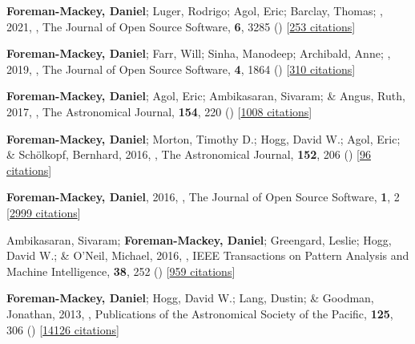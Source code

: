 \item[{\color{numcolor}\scriptsize7}] \textbf{Foreman-Mackey, Daniel}; Luger, Rodrigo; Agol, Eric; Barclay, Thomas; \etal, 2021, , The Journal of Open Source Software, \textbf{6}, 3285 () [\href{https://ui.adsabs.harvard.edu/abs/2021JOSS....6.3285F}{253 citations}]

\item[{\color{numcolor}\scriptsize6}] \textbf{Foreman-Mackey, Daniel}; Farr, Will; Sinha, Manodeep; Archibald, Anne; \etal, 2019, , The Journal of Open Source Software, \textbf{4}, 1864 () [\href{https://ui.adsabs.harvard.edu/abs/2019JOSS....4.1864F}{310 citations}]

\item[{\color{numcolor}\scriptsize5}] \textbf{Foreman-Mackey, Daniel}; Agol, Eric; Ambikasaran, Sivaram; \& Angus, Ruth, 2017, , The Astronomical Journal, \textbf{154}, 220 () [\href{https://ui.adsabs.harvard.edu/abs/2017AJ....154..220F}{1008 citations}]

\item[{\color{numcolor}\scriptsize4}] \textbf{Foreman-Mackey, Daniel}; Morton, Timothy D.; Hogg, David W.; Agol, Eric; \& Sch{\"o}lkopf, Bernhard, 2016, , The Astronomical Journal, \textbf{152}, 206 () [\href{https://ui.adsabs.harvard.edu/abs/2016AJ....152..206F}{96 citations}]

\item[{\color{numcolor}\scriptsize3}] \textbf{Foreman-Mackey, Daniel}, 2016, , The Journal of Open Source Software, \textbf{1}, 2 [\href{https://scholar.google.com/scholar?cites=1835087844145558435,17325274697099535179,14220488595059618709,12820425635803494730,7284810048757141243,17415935839493019063}{2999 citations}]

\item[{\color{numcolor}\scriptsize2}] Ambikasaran, Sivaram; \textbf{Foreman-Mackey, Daniel}; Greengard, Leslie; Hogg, David W.; \& O'Neil, Michael, 2016, , IEEE Transactions on Pattern Analysis and Machine Intelligence, \textbf{38}, 252 () [\href{https://scholar.google.com/scholar?cites=7122560326210979193,5194420368165307096,3347404430934682534}{959 citations}]

\item[{\color{numcolor}\scriptsize1}] \textbf{Foreman-Mackey, Daniel}; Hogg, David W.; Lang, Dustin; \& Goodman, Jonathan, 2013, , Publications of the Astronomical Society of the Pacific, \textbf{125}, 306 () [\href{https://ui.adsabs.harvard.edu/abs/2013PASP..125..306F}{14126 citations}]